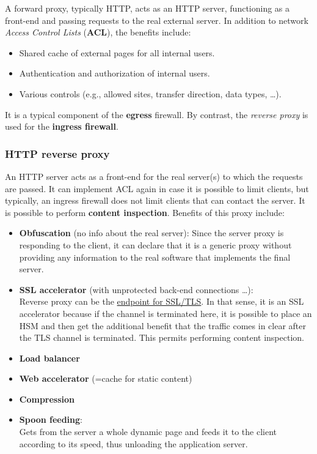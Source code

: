 A forward proxy, typically HTTP, acts as an HTTP server, functioning as a front-end and passing requests to the real external server. In addition to network \textit{Access Control Lists} (\textbf{ACL}), the benefits include:

\begin{itemize}
    \item Shared cache of external pages for all internal users.
    \item Authentication and authorization of internal users.
    \item Various controls (e.g., allowed sites, transfer direction, data types, …).
\end{itemize}

It is a typical component of the \textbf{egress} firewall. By contrast, the \textit{reverse proxy} is used for the \textbf{ingress firewall}.

\subsubsection{HTTP reverse proxy}

An HTTP server acts as a front-end for the real server(s) to which the requests are passed. It can implement ACL again in case it is possible to limit clients, but typically, an ingress firewall does not limit clients that can contact the server. It is possible to perform \textbf{content inspection}.
Benefits of this proxy include:

\begin{itemize}
    \item \textbf{Obfuscation} (no info about the real server):
          Since the server proxy is responding to the client, it can declare that it is a generic proxy without providing any information to the real software that implements the final server.
    \item \textbf{SSL accelerator} (with unprotected back-end connections …):\\
          Reverse proxy can be the \underline{endpoint for SSL/TLS}. In that sense, it is an SSL accelerator because if the channel is terminated here, it is possible to place an HSM and then get the additional benefit that the traffic comes in clear after the TLS channel is terminated. This permits performing content inspection.
    \item \textbf{Load balancer}
    \item \textbf{Web accelerator} (=cache for static content)
    \item \textbf{Compression}
    \item \textbf{Spoon feeding}:\\
          Gets from the server a whole dynamic page and feeds it to the client according to its speed, thus unloading the application server.
\end{itemize}


